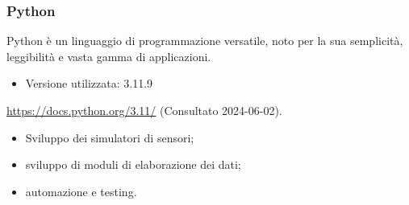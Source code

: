 \subsubsection{Python}
Python è un linguaggio di programmazione versatile, noto per la sua semplicità, leggibilità e vasta gamma di applicazioni.
\begin{itemize}
    \item Versione utilizzata: 3.11.9
\end{itemize}
\begin{center}
    \url{https://docs.python.org/3.11/} (Consultato 2024-06-02).
\end{center}
\begin{itemize}
    \item Sviluppo dei simulatori di sensori;
    \item sviluppo di moduli di elaborazione dei dati;
    \item automazione e testing.
\end{itemize}
